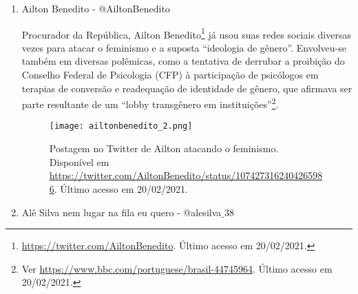 \documentclass[
	12pt,				%
	openright,			%
	twoside,			%
	a4paper,			%
	english,			%
	brazil				%
	]{abntex2}
\begin{document}
\begin{anexosenv}
\begin{enumerate}
 \begin{figure}[!htbp]
    \centering
    \texttt{[image: abweint\_1.png]}
    \caption{Postagem no Twitter de Abraham Weintraub ironizando um suposto nome ``feminista'' dado a seu animal de estimação. Disponível em \url{https://twitter.com/AbrahamWeint/status/1178414831541608451}. Último acesso em 20/02/2021.}
 \end{figure}

 \newpage

 \item Ailton Benedito - @AiltonBenedito
 
 Procurador da República, Ailton Benedito\footnote{\url{https://twitter.com/AiltonBenedito}. Último acesso em 20/02/2021.} já usou suas redes sociais diversas vezes para atacar o feminismo e a suposta ``ideologia de gênero''. Envolveu-se também em diversas polêmicas, como a tentativa de derrubar a proibição do Conselho Federal de Psicologia (CFP) à participação de psicólogos em terapias de conversão e readequação de identidade de gênero, que afirmava ser parte resultante de um ``lobby transgênero em instituições''\footnote{Ver \url{https://www.bbc.com/portuguese/brasil-44745964}. Último acesso em 20/02/2021.}.
 
 \begin{figure}[!htbp]
    \centering
    \texttt{[image: ailtonbenedito\_2.png]}
    \caption{Postagem no Twitter de Ailton atacando o feminismo. Disponível em \url{https://twitter.com/AiltonBenedito/status/1074273162404265986}. Último acesso em 20/02/2021.}
 \end{figure}


 \item Alê Silva nem lugar na fila eu quero - @alesilva$\_$38
 

\end{enumerate}
\end{anexosenv}
\end{document}
